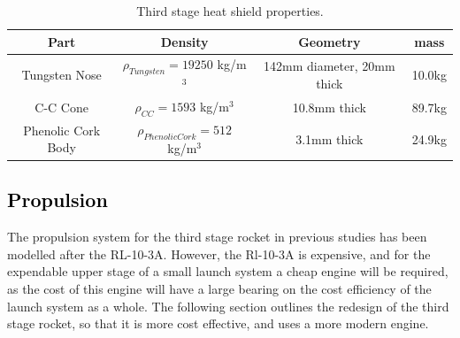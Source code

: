 		\begin{table}[h]
			\centering
\begin{tabular}{|c|c|c|c|}
	\hline  Part & Density & Geometry & mass \\ 
	\hline  Tungsten Nose & $\rho_{Tungsten} = 19250$  kg/m$^3$ & 142mm diameter, 20mm thick & 10.0kg \\ 
		\hline C-C Cone & $\rho_{CC} = 1593$  kg/m$^3$ & 10.8mm thick & 89.7kg \\ 
			\hline Phenolic Cork Body & $\rho_{Phenolic Cork} = 512$  kg/m$^3$ & 3.1mm thick & 24.9kg \\ 
	\hline 
\end{tabular} 
\caption{Third stage heat shield properties.} %
\label{tab:heatshield}
\end{table}
		
		\textcolor{black}{
		\subsection{Propulsion}\label{sec:thirdstageprop}
	}
	\noindent
	The propulsion system for the third stage rocket in previous studies has been modelled after the RL-10-3A\cite{Preller2018a}. However, the Rl-10-3A is expensive, and for the expendable upper stage of a small launch system a cheap engine will be required, as the cost of this engine will have a large bearing on the cost efficiency of the launch system as a whole. The following section outlines the redesign of the third stage rocket, so that it is more cost effective, and uses a more modern engine.  
	

